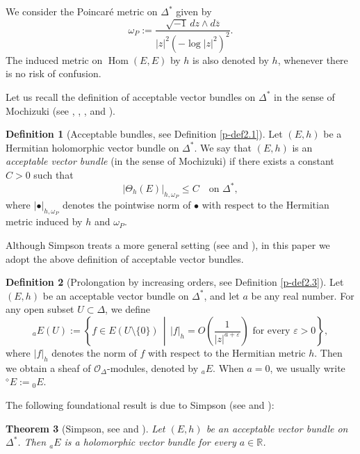 \documentclass[12pt,twoside]{amsart}
\DeclareMathOperator{\Hom}{Hom}
\newtheorem{thm}{Theorem}[section]
\theoremstyle{definition}
\newtheorem{defn}[thm]{Definition}
\begin{document}
We consider the Poincar\'e metric on $\Delta^*$ given by
\[
\omega_P := \frac{\sqrt{-1}\,dz \wedge d\overline{z}}{|z|^2 (-\log|z|^2)^2}.
\]
The induced metric on $\Hom(E, E)$ by 
$h$ is also denoted by $h$, whenever there is no risk of confusion.

Let us recall the definition of acceptable 
vector bundles on $\Delta^*$ in the sense of Mochizuki (see 
\cite{mochizuki1}, \cite{mochizuki2}, 
\cite{mochizuki3}, and \cite[Chapter 21]{mochizuki4}).

\begin{defn}[Acceptable bundles, see Definition \ref{p-def2.1}]\label{p-def1.1}
Let $(E, h)$ be a Hermitian holomorphic vector bundle on $\Delta^*$.  
We say that $(E, h)$ is an \emph{acceptable vector bundle} (in 
the sense of Mochizuki) if there exists a constant $C > 0$ such that
\[
|\Theta_h(E)|_{h, \omega_P} \leq C \quad \text{on } \Delta^*,
\]
where $|\bullet|_{h, \omega_P}$ denotes the pointwise 
norm of $\bullet$ with respect to the Hermitian metric induced by $h$ and $\omega_P$. 
\end{defn}

Although Simpson treats a more general setting (see \cite[Section 10]{simpson1} 
and \cite[Section 3]{simpson2}), 
in this paper we adopt the above definition of acceptable vector bundles.

\begin{defn}[Prolongation by increasing orders, 
see Definition \ref{p-def2.3}]\label{p-def1.2}
Let $(E, h)$ be an acceptable vector bundle on $\Delta^*$, 
and let $a$ be any real number.
For any open subset $U \subset \Delta$, we define
\[
{}_a E(U) := \left\{ f \in 
E(U \setminus \{0\}) \,\middle|\, |f|_h = O\left(\frac{1}{|z|^{a+\varepsilon}}\right) 
\text{ for every } \varepsilon > 0 \right\}, 
\] 
where $|f|_h$ denotes the norm of $f$ with respect 
to the Hermitian metric $h$. 
Then we obtain a sheaf of \( \mathcal{O}_\Delta \)-modules, 
denoted by \( {}_a E \). 
When $a = 0$, we usually write ${}^\diamond\! E := {}_0 E$.
\end{defn}

The following foundational result is due to Simpson (see \cite{simpson1} and 
\cite{simpson2}):

\begin{thm}[Simpson, 
see \cite{simpson1} and \cite{simpson2}]\label{p-thm1.3}
Let $(E, h)$ be an acceptable vector 
bundle on $\Delta^*$. Then ${}_a E$ is a 
holomorphic vector bundle for every $a \in \mathbb{R}$.
\end{thm}
\end{document}

